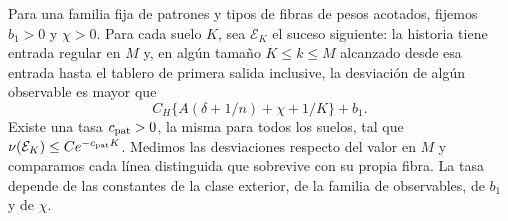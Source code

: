 \begin{proposicion}\label{prop:concentracion-meso}
Para una familia fija de patrones y tipos de fibras de pesos acotados, fijemos $b_1>0$ y $\chi>0$.
Para cada suelo $K$, sea $\mathcal E_K$ el suceso siguiente: la historia tiene entrada regular en
$M$ y, en algún tamaño $K\le k\le M$ alcanzado desde esa entrada hasta el tablero de primera salida
inclusive, la desviación de algún observable es mayor que
\[
 C_H\{A(\delta+1/n)+\chi+1/K\}+b_1 .
\]
Existe una tasa $c_{\rm pat}>0$, la misma para todos los suelos, tal que
$\nu(\mathcal E_K)\le C e^{-c_{\rm pat}K}$. Medimos las desviaciones respecto del valor en $M$ y
comparamos cada línea distinguida que
sobrevive con su propia fibra. La tasa depende de las constantes de la clase exterior, de la
familia de observables, de $b_1$ y de $\chi$.
\end{proposicion}

